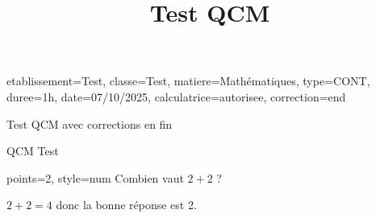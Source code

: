 \documentclass{nfdevoirs}
\title{Test QCM}
\begin{document}
\begin{devoir}{
    etablissement={Test},
    classe={Test},
    matiere={Mathématiques},
    type={CONT},
    duree={1h},
    date={07/10/2025},
    calculatrice={autorisee},
    correction={end}
}

\begin{partie}{Test QCM avec corrections en fin}

    \begin{exercice}{QCM Test}

        \begin{qcm}{points=2, style=num}
            Combien vaut $2 + 2$ ?
            \begin{choix}
            \end{choix}
        \end{qcm}

        \begin{correction}
            $2 + 2 = 4$ donc la bonne réponse est 2.
        \end{correction}

    \end{exercice}

\end{partie}

\end{devoir}
\end{document}
